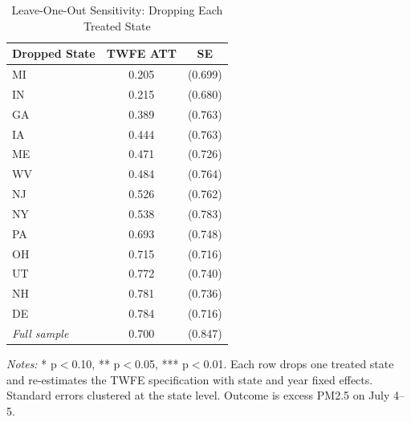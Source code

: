\begin{table}[H]
\centering
\caption{Leave-One-Out Sensitivity: Dropping Each Treated State}
\begin{threeparttable}
\begin{tabular}{lcc}
\toprule
Dropped State & TWFE ATT & SE \\
\midrule
MI & 0.205 & (0.699) \\
IN & 0.215 & (0.680) \\
GA & 0.389 & (0.763) \\
IA & 0.444 & (0.763) \\
ME & 0.471 & (0.726) \\
WV & 0.484 & (0.764) \\
NJ & 0.526 & (0.762) \\
NY & 0.538 & (0.783) \\
PA & 0.693 & (0.748) \\
OH & 0.715 & (0.716) \\
UT & 0.772 & (0.740) \\
NH & 0.781 & (0.736) \\
DE & 0.784 & (0.716) \\
\addlinespace
\textit{Full sample} & 0.700 & (0.847) \\
\bottomrule
\end{tabular}
\begin{tablenotes}[flushleft]
\small
\item \textit{Notes:} * p$<$0.10, ** p$<$0.05, *** p$<$0.01. Each row drops one treated state and re-estimates the TWFE specification with state and year fixed effects. Standard errors clustered at the state level. Outcome is excess PM2.5 on July 4--5.
\end{tablenotes}
\end{threeparttable}
\label{tab:loo}
\end{table}
